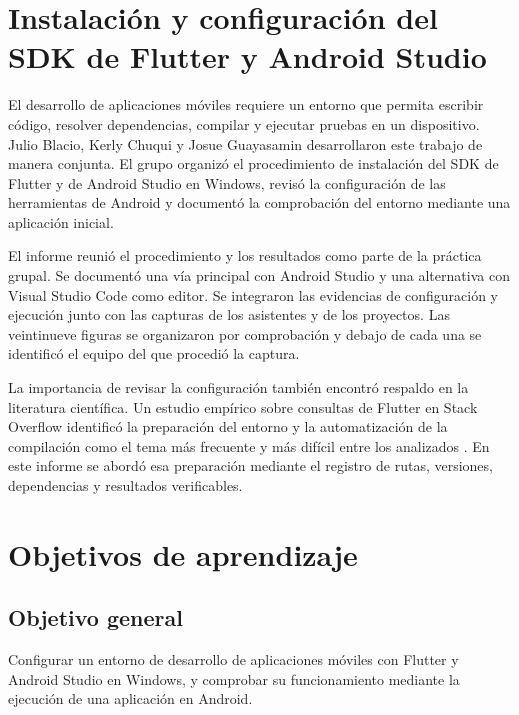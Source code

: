 \documentclass[12pt,letterpaper]{article}
\begin{document}
\section*{Instalación y configuración del SDK de Flutter y Android Studio}
El desarrollo de aplicaciones móviles requiere un entorno que permita escribir código, resolver dependencias, compilar y ejecutar pruebas en un dispositivo. Julio Blacio, Kerly Chuqui y Josue Guayasamin desarrollaron este trabajo de manera conjunta. El grupo organizó el procedimiento de instalación del SDK de Flutter y de Android Studio en Windows, revisó la configuración de las herramientas de Android y documentó la comprobación del entorno mediante una aplicación inicial.

El informe reunió el procedimiento y los resultados como parte de la práctica grupal. Se documentó una vía principal con Android Studio y una alternativa con Visual Studio Code como editor. Se integraron las evidencias de configuración y ejecución junto con las capturas de los asistentes y de los proyectos. Las veintinueve figuras se organizaron por comprobación y debajo de cada una se identificó el equipo del que procedió la captura.

La importancia de revisar la configuración también encontró respaldo en la literatura científica. Un estudio empírico sobre consultas de Flutter en Stack Overflow identificó la preparación del entorno y la automatización de la compilación como el tema más frecuente y más difícil entre los analizados \citep{alanazi2024}. En este informe se abordó esa preparación mediante el registro de rutas, versiones, dependencias y resultados verificables.

\section{Objetivos de aprendizaje}
\subsection{Objetivo general}
Configurar un entorno de desarrollo de aplicaciones móviles con Flutter y Android Studio en Windows, y comprobar su funcionamiento mediante la ejecución de una aplicación en Android.
\end{document}

